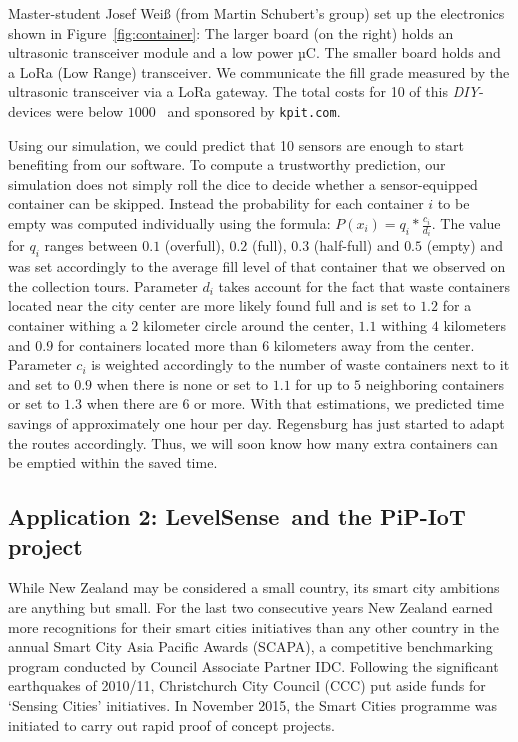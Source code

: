 \documentclass[10pt]{article}
\begin{document}
Master-student Josef Wei{\ss} (from Martin Schubert's group) set up the electronics
shown in Figure~\ref{fig:container}: The larger board (on the right) holds an ultrasonic transceiver module and a low power µC. The smaller board holds and a 
LoRa (Low Range) transceiver. We communicate the fill grade measured by the 
ultrasonic transceiver via a LoRa gateway. The total costs for 10 of this {\it DIY}-devices 
were below $1000$~\EUR{} and sponsored by {\tt kpit.com}.

Using our simulation, we could predict that 10 sensors are enough to start
benefiting from our software. To compute a trustworthy prediction, our simulation
does not simply roll the dice to decide whether a sensor-equipped container can
be skipped. Instead the probability for each container $i$ to be empty was 
computed individually using the formula: $P(x_i)=q_i* \frac{c_i}{d_i}$. The value for 
$q_i$ ranges between $0.1$ (overfull), $0.2$ (full), $0.3$ (half-full) and $0.5$ (empty)
and was set accordingly to the average fill level of that container that we observed on
the collection tours. Parameter $d_i$ takes account for the fact that waste containers 
located near the city center are more likely found full and is set to $1.2$ for a container
withing a $2$ kilometer circle around the center, $1.1$ withing $4$ kilometers and $0.9$ for 
containers located more than $6$ kilometers away from the center. Parameter $c_i$ is weighted 
accordingly to the number of waste containers next to it and set to $0.9$ when there is none or
set to $1.1$ for up to $5$ neighboring containers or set to $1.3$ when there are $6$ or more.
With that estimations, we predicted time savings of approximately one hour per day.
Regensburg has just started to adapt the routes accordingly. Thus, we will soon
know how many extra containers can be emptied within the saved time.

\subsection{Application 2: LevelSense\texttrademark ~and the PiP-IoT project}
\label{sec:Christchurch}

While New Zealand may be considered a small country, its smart city ambitions are anything but small. For the last two consecutive years New Zealand earned more recognitions for their smart cities initiatives than any other country in the annual Smart City Asia Pacific Awards (SCAPA), a competitive benchmarking program conducted by Council Associate Partner IDC.
Following the significant earthquakes of 2010/11, Christchurch City Council (CCC) put aside funds for ‘Sensing Cities’ initiatives. In November 2015, the Smart Cities programme was initiated to carry out rapid proof of concept projects.
\end{document}
